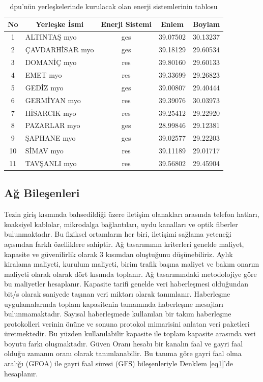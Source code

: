 \begin{table}[htbp]
\centering
\caption{\gls{dpu}'nün yerleşkelerinde kurulacak olan enerji sistemlerinin tablosu}
\label{tab:tabb1}
\begin{tabular}{clccc}
\hline
No & \multicolumn{1}{c}{Yerleşke İsmi} & \multicolumn{1}{c}{Enerji Sistemi} & Enlem & Boylam \\ \hline
1  & ALTINTAŞ \gls{myo}    & \gls{ges}  & 39.07502 & 30.13237 \\
\hline
2  & ÇAVDARHİSAR \gls{myo} & \gls{ges}  & 39.18129 & 29.60534 \\
\hline
3  & DOMANİÇ \gls{myo}     & \gls{res} & 39.80160 & 29.60133 \\
\hline
4  & EMET \gls{myo}        & \gls{res} & 39.33699 & 29.26823 \\
\hline
5  & GEDİZ \gls{myo}       & \gls{ges}  & 39.00807 & 29.40444 \\
\hline
6  & GERMİYAN \gls{myo}    & \gls{res} & 39.39076 & 30.03973 \\
\hline
7  & HİSARCIK \gls{myo}    & \gls{res} & 39.25412 & 29.22920 \\
\hline
8  & PAZARLAR \gls{myo}    & \gls{ges}  & 28.99846 & 29.12381 \\
\hline
9  & ŞAPHANE \gls{myo}     & \gls{ges}  & 39.02577 & 29.22203 \\
\hline
10 & SİMAV \gls{myo}       & \gls{res} & 39.11189 & 29.01717 \\
\hline
11 & TAVŞANLI \gls{myo}    & \gls{res} & 39.56802 & 29.45904\\
\hline

\end{tabular}
\end{table}
\subsection{Ağ Bileşenleri}

Tezin giriş kısmında bahsedildiği üzere iletişim olanakları arasında telefon hatları, koaksiyel kablolar, mikrodalga bağlantıları, uydu kanalları ve optik fiberler bulunmaktadır. Bu fiziksel ortamların her biri, iletişimi sağlama yeteneği açısından farklı özelliklere sahiptir. Ağ tasarımının kriterleri genelde maliyet, kapasite ve güvenilirlik olarak 3 kısımdan oluştuğunu düşünebiliriz. Aylık kiralama maliyeti, kurulum maliyeti, birim trafik başına maliyet ve bakım onarım maliyeti olarak olarak dört kısımda toplanır. Ağ tasarımındaki metodolojiye göre bu maliyetler hesaplanır. Kapasite tarifi genelde veri haberleşmesi olduğundan bit/s olarak saniyede taşınan veri miktarı olarak tanımlanır. Haberleşme uygulamalarında toplam kapasitenin tamamında haberleşme mesajları bulunmamaktadır. Sayısal haberleşmede kullanılan bir takım haberleşme protokolleri verinin önüne ve sonuna protokol mimarisini anlatan veri paketleri üretmektedir. Bu yüzden kullanılabilir kapasite ile toplam kapasite arasında veri boyutu farkı oluşmaktadır. Güven Oranı hesabı bir kanalın faal ve gayri faal olduğu zamanın oranı olarak tanımlanabilir. Bu tanıma göre gayri faal olma aralığı (GFOA) ile gayri faal süresi (GFS) bileşenleriyle Denklem \eqref{eq1}'de hesaplanır. 

